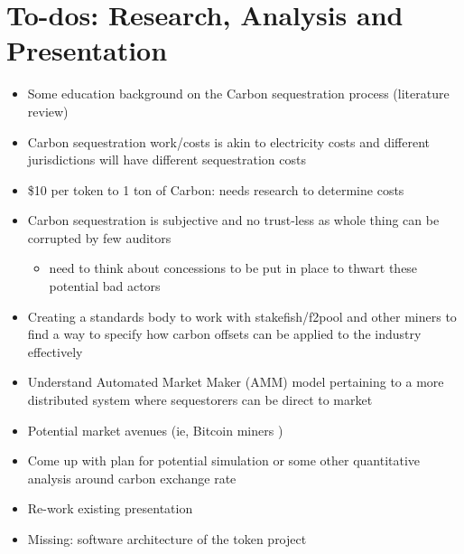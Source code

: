 \documentclass{article}
\begin{document}
\section{To-dos: Research, Analysis and Presentation}

\begin{itemize}
\item Some education background on the Carbon sequestration process (literature review)
\item Carbon sequestration work/costs is akin to electricity costs and different jurisdictions will have different sequestration costs
\item \$10 per token to 1 ton of Carbon: needs research to determine costs
\item Carbon sequestration is subjective and no trust-less  as whole thing can be corrupted by few auditors
\begin{itemize}
\item need to think about concessions to be put in place to thwart these potential bad actors
\end{itemize}
\item Creating a standards body to work with stakefish/f2pool and other miners to find a way to
specify how carbon offsets can be applied to the industry effectively
\item Understand Automated Market Maker (AMM) model pertaining to a more distributed system where sequestorers can be direct to market
\item Potential market avenues (ie, Bitcoin miners )
\item Come up with plan for potential simulation or some other quantitative analysis around carbon exchange rate
\item Re-work existing presentation
\item Missing: software architecture of the token project
\end{itemize}


\label{section:summary}
\end{document}
